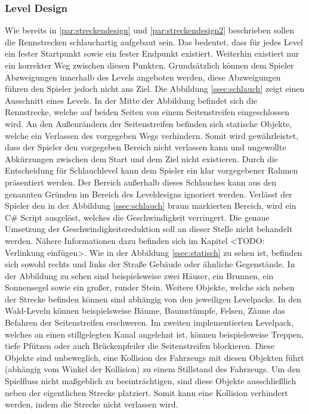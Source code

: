 	\subsubsection{Level Design}
		Wie bereits in \ref{par:streckendesign} und \ref{par:streckendesign2} beschrieben sollen die Rennstrecken schlauchartig aufgebaut sein. Das bedeutet, dass für jedes Level ein fester Startpunkt sowie ein fester Endpunkt existiert. Weiterhin existiert nur ein korrekter Weg zwischen diesen Punkten. Grundsätzlich können dem Spieler Abzweigungen innerhalb des Levels angeboten werden, diese Abzweigungen führen den Spieler jedoch nicht ans Ziel.
		Die Abbildung \ref{ssec:schlauch} zeigt einen Ausschnitt eines Levels. In der Mitte der Abbildung befindet sich die Rennstrecke, welche auf beiden Seiten von einem Seitenstreifen eingeschlossen wird. An den Außenrändern der Seitenstreifen befinden sich statische Objekte, welche ein Verlassen des vorgegeben Wegs verhindern. Somit wird gewährleistet, dass der Spieler den vorgegeben Bereich nicht verlassen kann und ungewollte Abkürzungen zwischen dem Start und dem Ziel nicht existieren. Durch die Entscheidung für Schlauchlevel kann dem Spieler ein klar vorgegebener Rahmen präsentiert werden. Der Bereich außerhalb dieses Schlauches kann aus den genannten Gründen im Bereich des Leveldesigns ignoriert werden. Verlässt der Spieler den in der Abbildung \ref{ssec:schlauch} braun markierten Bereich, wird ein C\# Script ausgelöst, welches die Geschwindigkeit verringert. Die genaue Umsetzung der Geschwindigkeitsreduktion soll an dieser Stelle nicht behandelt werden. Nähere Informationen dazu befinden sich im Kapitel <TODO: Verlinkung einfügen>.
		Wie in der Abbildung \ref{ssec:statisch} zu sehen ist, befinden sich sowohl rechts und links der Straße Gebäude oder ähnliche Gegenstände. In der Abbildung zu sehen sind beispielsweise zwei Häuser, ein Brunnen, ein Sonnensegel sowie ein großer, runder Stein. Weitere Objekte, welche sich neben der Strecke befinden können sind abhängig von den jeweiligen Levelpacks. In den Wald-Leveln können beispielsweise Bäume, Baumstümpfe, Felsen, Zäune das Befahren der Seitenstreifen erschweren. Im zweiten implementierten Levelpack, welches an einen stillgelegten Kanal angelehnt ist, können beispielsweise Treppen, tiefe Pfützen oder auch Brückenpfeiler die Seitenstreifen blockieren. Diese Objekte sind unbeweglich, eine Kollision des Fahrzeugs mit diesen Objekten führt (abhängig vom Winkel der Kollision) zu einem Stillstand des Fahrzeugs. Um den Spielfluss nicht maßgeblich zu beeinträchtigen, sind diese Objekte ausschließlich neben der eigentlichen Strecke platziert. Somit kann eine Kollision verhindert werden, indem die Strecke nicht verlassen wird.
